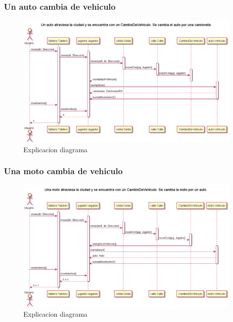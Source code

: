 \documentclass[titlepage,a4paper]{article}
\begin{document}
\subsubsection[Un auto cambia de vehiculo]{Un auto cambia de vehiculo}

\begin{figure}[H]
  \centering
  \includegraphics[width=1\textwidth]{diagramas/SecuenciaAutoCambiaVehiculo.png}
  \caption{\label{fig:class01}Explicacion diagrama}
\end{figure}



\subsubsection[Una moto cambia de vehiculo]{Una moto cambia de vehiculo}

\begin{figure}[H]
  \centering
  \includegraphics[width=1\textwidth]{diagramas/SecuenciaMotoCambiaVehiculo.png}
  \caption{\label{fig:class01}Explicacion diagrama}
\end{figure}
\end{document}
